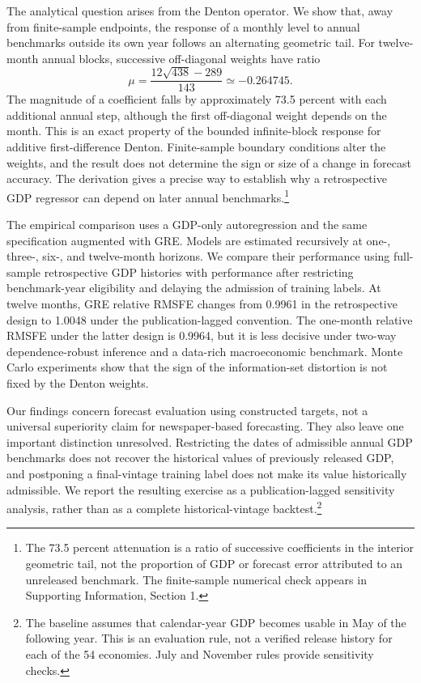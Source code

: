 \documentclass[preprint,12pt,authoryear]{elsarticle}
\begin{document}
The analytical question arises from the Denton operator. We show that, away from finite-sample endpoints, the response of a monthly level to annual benchmarks outside its own year follows an alternating geometric tail. For twelve-month annual blocks, successive off-diagonal weights have ratio
\begin{equation}
\mu=\frac{12\sqrt{438}-289}{143}\simeq-0.264745.
\label{eq:intro_mu}
\end{equation}
The magnitude of a coefficient falls by approximately 73.5 percent with each additional annual step, although the first off-diagonal weight depends on the month. This is an exact property of the bounded infinite-block response for additive first-difference Denton. Finite-sample boundary conditions alter the weights, and the result does not determine the sign or size of a change in forecast accuracy. The derivation gives a precise way to establish why a retrospective GDP regressor can depend on later annual benchmarks.\footnote{The 73.5 percent attenuation is a ratio of successive coefficients in the interior geometric tail, not the proportion of GDP or forecast error attributed to an unreleased benchmark. The finite-sample numerical check appears in Supporting Information, Section 1.}

The empirical comparison uses a GDP-only autoregression and the same specification augmented with GRE. Models are estimated recursively at one-, three-, six-, and twelve-month horizons. We compare their performance using full-sample retrospective GDP histories with performance after restricting benchmark-year eligibility and delaying the admission of training labels. At twelve months, GRE relative RMSFE changes from 0.9961 in the retrospective design to 1.0048 under the publication-lagged convention. The one-month relative RMSFE under the latter design is 0.9964, but it is less decisive under two-way dependence-robust inference and a data-rich macroeconomic benchmark. Monte Carlo experiments show that the sign of the information-set distortion is not fixed by the Denton weights.

Our findings concern forecast evaluation using constructed targets, not a universal superiority claim for newspaper-based forecasting. They also leave one important distinction unresolved. Restricting the dates of admissible annual GDP benchmarks does not recover the historical values of previously released GDP, and postponing a final-vintage training label does not make its value historically admissible. We report the resulting exercise as a publication-lagged sensitivity analysis, rather than as a complete historical-vintage backtest.\footnote{The baseline assumes that calendar-year GDP becomes usable in May of the following year. This is an evaluation rule, not a verified release history for each of the 54 economies. July and November rules provide sensitivity checks.}
\end{document}
